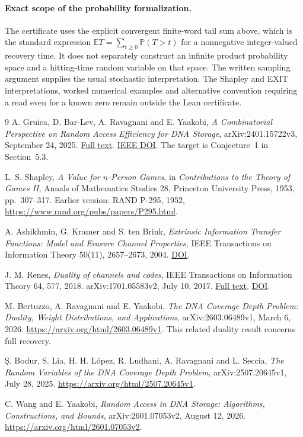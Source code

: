 \documentclass[11pt]{article}
\theoremstyle{remark}
\newcommand{\E}{\mathbb E}
\newcommand{\Prob}{\mathbb P}
\begin{document}
\paragraph{Exact scope of the probability formalization.}
The certificate uses the explicit convergent finite-word tail sum above,
which is the standard expression $\E T=\sum_{t\geq0}\Prob(T>t)$ for a
nonnegative integer-valued recovery time. It does not separately construct
an infinite product probability space and a hitting-time random variable
on that space. The written sampling argument supplies the usual stochastic
interpretation. The Shapley and EXIT interpretations, worked numerical examples and
alternative convention requiring a read even for a known zero remain
outside the Lean certificate.

\begin{thebibliography}{9}
A. Gruica, D. Bar-Lev, A. Ravagnani and E. Yaakobi,
\emph{A Combinatorial Perspective on Random Access Efficiency for DNA Storage},
arXiv:2401.15722v3, September 24, 2025.
\href{https://arxiv.org/html/2401.15722v3}{Full text}.
\href{https://doi.org/10.1109/TIT.2025.3623202}{IEEE DOI}.
The target is Conjecture~1 in Section~5.3.

L. S. Shapley, \emph{A Value for $n$-Person Games},
in \emph{Contributions to the Theory of Games II},
Annals of Mathematics Studies 28, Princeton University Press, 1953,
pp.~307--317. Earlier version: RAND P-295, 1952,
\url{https://www.rand.org/pubs/papers/P295.html}.

A. Ashikhmin, G. Kramer and S. ten Brink,
\emph{Extrinsic Information Transfer Functions: Model and Erasure Channel
Properties}, IEEE Transactions on Information Theory 50(11), 2657--2673,
2004. \href{https://doi.org/10.1109/TIT.2004.836693}{DOI}.

J. M. Renes, \emph{Duality of channels and codes}, IEEE Transactions on
Information Theory 64, 577, 2018. arXiv:1701.05583v2, July 10, 2017.
\href{https://arxiv.org/html/1701.05583v2}{Full text}.
\href{https://doi.org/10.1109/TIT.2017.2754921}{DOI}.

M. Bertuzzo, A. Ravagnani and E. Yaakobi,
\emph{The DNA Coverage Depth Problem: Duality, Weight Distributions, and
Applications}, arXiv:2603.06489v1, March 6, 2026.
\url{https://arxiv.org/html/2603.06489v1}.
This related duality result concerns full recovery.

\c{S}. Bodur, S. Lia, H. H. L\'opez, R. Ludhani, A. Ravagnani and
L. Seccia, \emph{The Random Variables of the DNA Coverage Depth Problem},
arXiv:2507.20645v1, July 28, 2025.
\url{https://arxiv.org/html/2507.20645v1}.

C. Wang and E. Yaakobi, \emph{Random Access in DNA Storage: Algorithms,
Constructions, and Bounds}, arXiv:2601.07053v2, August 12, 2026.
\url{https://arxiv.org/html/2601.07053v2}.
\end{thebibliography}
\end{document}
